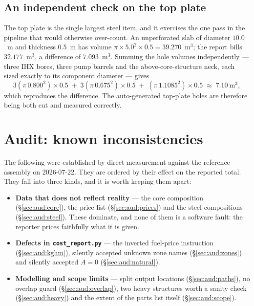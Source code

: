 \documentclass[9pt,a4paper]{extarticle}
\newcommand{\file}[1]{\texttt{\small #1}}
\begin{document}
\subsection{An independent check on the top plate}

The top plate is the single largest steel item, and it exercises the one pass in
the pipeline that would otherwise over-count. An unperforated slab of diameter
$10.0$~m and thickness $0.5$~m has volume $\pi \times 5.0^2 \times 0.5 =
39.270$~m$^3$; the report bills $32.177$~m$^3$, a difference of
$7.093$~m$^3$. Summing the hole volumes independently --- three IHX bores, three
pump barrels and the above-core-structure neck, each sized exactly to its
component diameter --- gives
\begin{equation*}
  3(\pi\,0.800^2) \times 0.5 \;+\; 3(\pi\,0.675^2) \times 0.5
  \;+\; (\pi\,1.1085^2) \times 0.5 \;\approx\; 7.10\ \text{m}^3 ,
\end{equation*}
which reproduces the difference. The auto-generated top-plate holes are
therefore being both cut and measured correctly.

\section{Audit: known inconsistencies}
\label{sec:audit}

The following were established by direct measurement against the reference
assembly on 2026-07-22. They are ordered by their effect on the reported total.
They fall into three kinds, and it is worth keeping them apart:

\begin{itemize}
  \item \textbf{Data that does not reflect reality} --- the core composition
        (\S\ref{sec:aud:core}), the price list (\S\ref{sec:aud:prices}) and the
        steel compositions (\S\ref{sec:aud:steel}). These dominate, and none of
        them is a software fault: the reporter prices faithfully what it is
        given.
  \item \textbf{Defects in \file{cost\_report.py}} --- the inverted fuel-price
        instruction (\S\ref{sec:aud:kghm}), silently accepted unknown zone names
        (\S\ref{sec:aud:zones}) and silently accepted $A=0$
        (\S\ref{sec:aud:natural}).
  \item \textbf{Modelling and scope limits} --- split output locations
        (\S\ref{sec:aud:paths}), no overlap guard (\S\ref{sec:aud:overlap}),
        two heavy structures worth a sanity check (\S\ref{sec:aud:heavy}) and
        the extent of the parts list itself (\S\ref{sec:aud:scope}).
\end{itemize}
\end{document}
